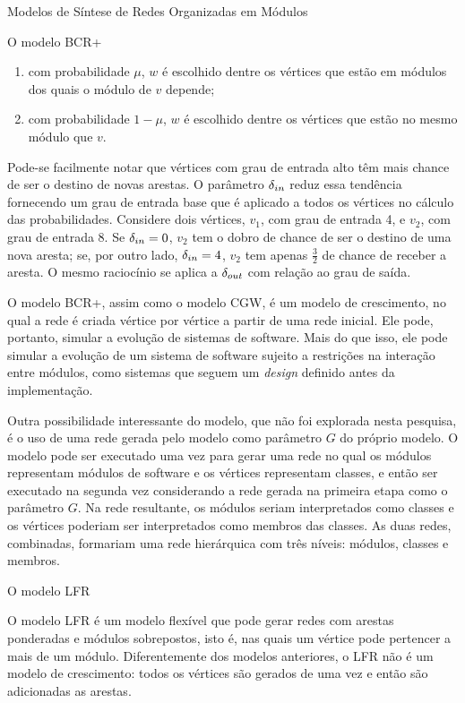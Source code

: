 \begin{section}{Modelos de Síntese de Redes Organizadas em Módulos}
\begin{subsection}{O modelo BCR+}
\begin{enumerate}
\begin{enumerate}
  \item com probabilidade $\mu$, $w$ é escolhido dentre os vértices que estão em módulos dos quais o módulo de $v$ depende;
  \item com probabilidade $1 - \mu$, $w$ é escolhido dentre os vértices que estão no mesmo módulo que $v$.
\end{enumerate}

\end{enumerate}

Pode-se facilmente notar que vértices com grau de entrada alto têm mais chance de ser o destino de novas arestas. O parâmetro $\delta_{in}$ reduz essa tendência fornecendo um grau de entrada base que é aplicado a todos os vértices no cálculo das probabilidades. Considere dois vértices, $v_1$, com grau de entrada 4, e $v_2$, com grau de entrada 8. Se $\delta_{in} = 0$, $v_2$ tem o dobro de chance de ser o destino de uma nova aresta; se, por outro lado, $\delta_{in} = 4$, $v_2$ tem apenas $\frac{3}{2}$ de chance de receber a aresta. O mesmo raciocínio se aplica a $\delta_{out}$ com relação ao grau de saída.

O modelo BCR+, assim como o modelo CGW, é um modelo de crescimento, no qual a rede é criada vértice por vértice a partir de uma rede inicial. Ele pode, portanto, simular a evolução de sistemas de software. Mais do que isso, ele pode simular a evolução de um sistema de software sujeito a restrições na interação entre módulos, como sistemas que seguem um \emph{design} definido antes da implementação.

Outra possibilidade interessante do modelo, que não foi explorada nesta pesquisa, é o uso de uma rede gerada pelo modelo como parâmetro $G$ do próprio modelo. O modelo pode ser executado uma vez para gerar uma rede no qual os módulos representam módulos de software e os vértices representam classes, e então ser executado na segunda vez considerando a rede gerada na primeira etapa como o parâmetro $G$. Na rede resultante, os módulos seriam interpretados como classes e os vértices poderiam ser interpretados como membros das classes. As duas redes, combinadas, formariam uma rede hierárquica com três níveis: módulos, classes e membros.

\end{subsection}

\begin{subsection}{O modelo LFR}

O modelo LFR \cite{Lancichinetti2009} é um modelo flexível que pode gerar redes com arestas ponderadas e módulos sobrepostos, isto é, nas quais um vértice pode pertencer a mais de um módulo. Diferentemente dos modelos anteriores, o LFR não é um modelo de crescimento: todos os vértices são gerados de uma vez e então são adicionadas as arestas.


\end{subsection}
\end{section}
